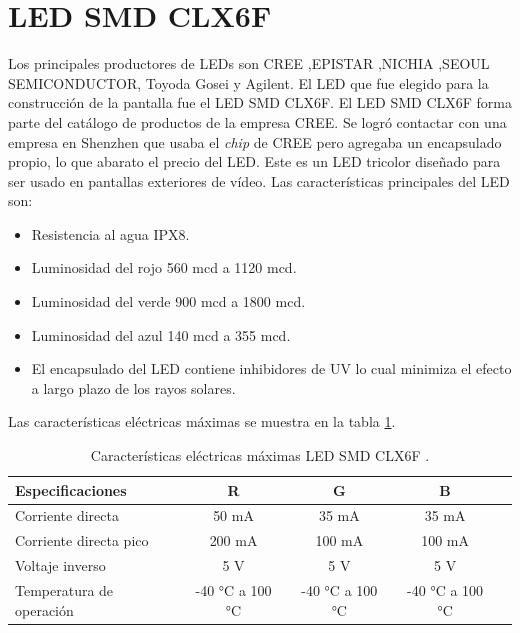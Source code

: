 \section{LED SMD CLX6F}
Los principales productores de LEDs son CREE ,EPISTAR ,NICHIA ,SEOUL SEMICONDUCTOR, Toyoda Gosei y Agilent.
El LED que fue elegido para la construcción de la pantalla fue el LED SMD CLX6F. El LED SMD CLX6F forma parte del catálogo de productos de la empresa CREE. Se logró contactar con una empresa en Shenzhen que usaba el \textit{chip} de CREE pero agregaba un encapsulado propio, lo que abarato el precio del LED. Este es un LED tricolor diseñado para ser usado en pantallas exteriores de vídeo. Las características principales del LED son:
\begin{itemize}
\item Resistencia al agua IPX8.
\item Luminosidad del rojo 560 mcd a 1120 mcd.
\item Luminosidad del verde 900 mcd a 1800 mcd.
\item Luminosidad del azul 140 mcd a 355 mcd.
\item El encapsulado del LED contiene inhibidores de UV lo cual minimiza el efecto a largo plazo de los rayos solares.
\end{itemize}

Las características eléctricas máximas se muestra en la tabla \ref{tab:MAXLEDCLX6F}.


\begin{table}[h]
\centering
\caption[Características eléctricas máximas LED CLX6F]{Características eléctricas máximas LED SMD CLX6F \protect\footnotemark.}
\begin{tabular}{l c c c c}
\toprule
\textbf{Especificaciones}& \textbf{R} & \textbf{G} & \textbf{B}\\
\midrule 


Corriente directa &50 mA &35 mA &35 mA\\
Corriente directa pico &200 mA &100 mA &100 mA \\
Voltaje inverso &5 V &5 V &5 V\\
Temperatura de operación &-40 \si{\degree}C a 100 \si{\degree}C  &-40 \si{\degree}C a 100 \si{\degree}C  &-40 \si{\degree}C a 100 \si{\degree}C\\


\bottomrule
\hline
\end{tabular}
\label{tab:MAXLEDCLX6F}
\end{table}




